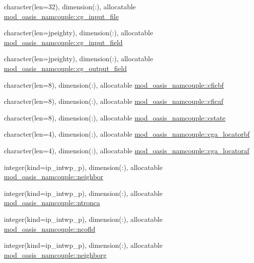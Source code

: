 \begin{DoxyCompactItemize}
\item 
character(len=32), dimension(\+:), allocatable \hyperlink{namespacemod__oasis__namcouple_a24f56cf88d79190f229d3fd1d62d17de}{mod\+\_\+oasis\+\_\+namcouple\+::cg\+\_\+input\+\_\+file}
\item 
character(len=jpeighty), dimension(\+:), allocatable \hyperlink{namespacemod__oasis__namcouple_aad4d4857b4c424e1b0f0bcc0a01aa6e3}{mod\+\_\+oasis\+\_\+namcouple\+::cg\+\_\+input\+\_\+field}
\item 
character(len=jpeighty), dimension(\+:), allocatable \hyperlink{namespacemod__oasis__namcouple_a1b680bf476776f3db085dc1f0009736c}{mod\+\_\+oasis\+\_\+namcouple\+::cg\+\_\+output\+\_\+field}
\item 
character(len=8), dimension(\+:), allocatable \hyperlink{namespacemod__oasis__namcouple_a9e90e47fd11ff4dd95c61dcf3ec872ff}{mod\+\_\+oasis\+\_\+namcouple\+::cficbf}
\item 
character(len=8), dimension(\+:), allocatable \hyperlink{namespacemod__oasis__namcouple_a9b3c7c879a3ff2b5eb15cbcaf5a8a1d9}{mod\+\_\+oasis\+\_\+namcouple\+::cficaf}
\item 
character(len=8), dimension(\+:), allocatable \hyperlink{namespacemod__oasis__namcouple_a4b507ab44ad62713c9e3d83ded6be3f4}{mod\+\_\+oasis\+\_\+namcouple\+::cstate}
\item 
character(len=4), dimension(\+:), allocatable \hyperlink{namespacemod__oasis__namcouple_ac22155599e9b49d57514dd1f7dc9928a}{mod\+\_\+oasis\+\_\+namcouple\+::cga\+\_\+locatorbf}
\item 
character(len=4), dimension(\+:), allocatable \hyperlink{namespacemod__oasis__namcouple_a6f4080d45f0b9be5a0466967f535b83b}{mod\+\_\+oasis\+\_\+namcouple\+::cga\+\_\+locatoraf}
\item 
integer(kind=ip\+\_\+intwp\+\_\+p), dimension(\+:), allocatable \hyperlink{namespacemod__oasis__namcouple_a298c9165785ae1a41f89597cadd211e7}{mod\+\_\+oasis\+\_\+namcouple\+::neighbor}
\item 
integer(kind=ip\+\_\+intwp\+\_\+p), dimension(\+:), allocatable \hyperlink{namespacemod__oasis__namcouple_aaf9fd5eaa5d115f2548b8f78cdcd172d}{mod\+\_\+oasis\+\_\+namcouple\+::ntronca}
\item 
integer(kind=ip\+\_\+intwp\+\_\+p), dimension(\+:), allocatable \hyperlink{namespacemod__oasis__namcouple_a9f8a2a4f44b1c56860fef8df014339d3}{mod\+\_\+oasis\+\_\+namcouple\+::ncofld}
\item 
integer(kind=ip\+\_\+intwp\+\_\+p), dimension(\+:), allocatable \hyperlink{namespacemod__oasis__namcouple_a883d88938c50264711c53af2b555c3db}{mod\+\_\+oasis\+\_\+namcouple\+::neighborg}

\end{DoxyCompactItemize}
